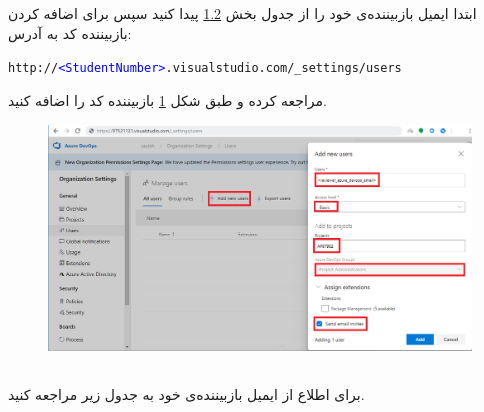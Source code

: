 \newpage

\section{}
\subsection{} \label{sec:add_reviewer}
ابتدا ایمیل بازبیننده‌ی خود را از جدول بخش
\ref{sec:reviwers_table}
پیدا کنید سپس
برای اضافه کردن بازبیننده کد به آدرس:
\begin{latin}
	\texttt{http://\textcolor{blue}{<StudentNumber>}.visualstudio.com/\_settings/users}
\end{latin}
مراجعه کرده و طبق شکل
\ref{fig:admin-access}
بازبیننده کد را اضافه کنید.

\begin{figure}[ht]
	\centering
	\label{fig:admin-access}
	\caption{}
	\includegraphics[width=\textwidth,height=\textwidth,keepaspectratio]{./images/AdminAccess.png}
\end{figure}
\newpage
\subsection{} \label{sec:reviwers_table}
برای اطلاع از ایمیل بازبیننده‌ی خود به جدول
زیر
مراجعه کنید.
\RTL

